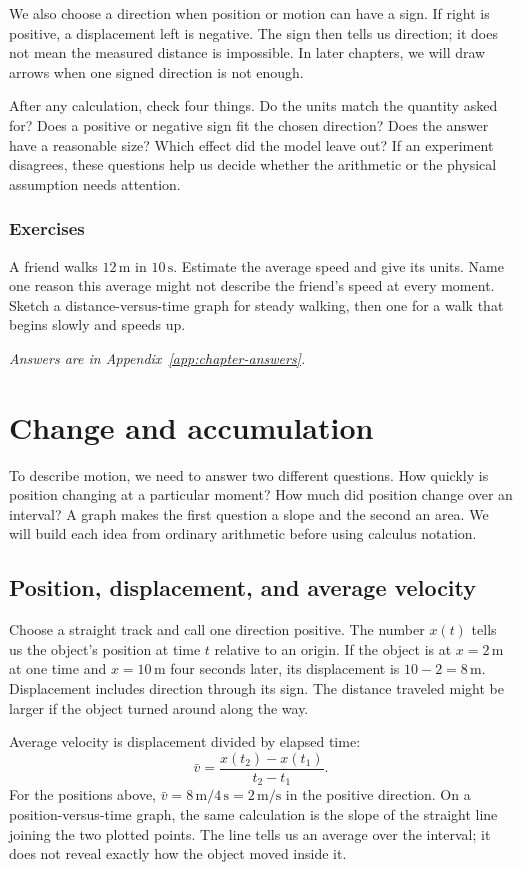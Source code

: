 \documentclass[11pt,oneside]{book}
\theoremstyle{reviewstyle}
\newcommand{\learningcheck}[1]{\subsection*{Exercises}\noindent #1\par\smallskip\noindent\emph{Answers are in Appendix~\ref{app:chapter-answers}.}}
\begin{document}
We also choose a direction when position or motion can have a sign. If right is positive, a displacement left is negative. The sign then tells us direction; it does not mean the measured distance is impossible. In later chapters, we will draw arrows when one signed direction is not enough.

After any calculation, check four things. Do the units match the quantity asked for? Does a positive or negative sign fit the chosen direction? Does the answer have a reasonable size? Which effect did the model leave out? If an experiment disagrees, these questions help us decide whether the arithmetic or the physical assumption needs attention.

\learningcheck{A friend walks $12\,\mathrm m$ in $10\,\mathrm s$. Estimate the average speed and give its units. Name one reason this average might not describe the friend's speed at every moment. Sketch a distance-versus-time graph for steady walking, then one for a walk that begins slowly and speeds up.}

\chapter{Change and accumulation}
To describe motion, we need to answer two different questions. How quickly is position changing at a particular moment? How much did position change over an interval? A graph makes the first question a slope and the second an area. We will build each idea from ordinary arithmetic before using calculus notation.

\section{Position, displacement, and average velocity}
Choose a straight track and call one direction positive. The number $x(t)$ tells us the object's position at time $t$ relative to an origin. If the object is at $x=2\,\mathrm m$ at one time and $x=10\,\mathrm m$ four seconds later, its displacement is $10-2=8\,\mathrm m$. Displacement includes direction through its sign. The distance traveled might be larger if the object turned around along the way.

Average velocity is displacement divided by elapsed time:
\begin{equation}
\bar v=\frac{x(t_2)-x(t_1)}{t_2-t_1}.
\end{equation}
For the positions above, $\bar v=8\,\mathrm m/4\,\mathrm s=2\,\mathrm{m/s}$ in the positive direction. On a position-versus-time graph, the same calculation is the slope of the straight line joining the two plotted points. The line tells us an average over the interval; it does not reveal exactly how the object moved inside it.
\end{document}
